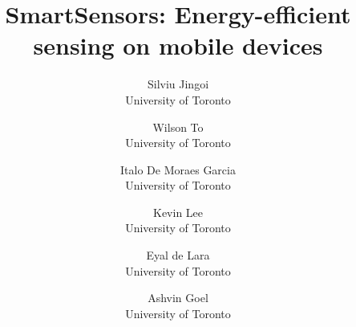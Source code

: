 \documentclass[letterpaper,twocolumn,10pt]{article}
\begin{document}
\date{}


\title{\Large \bf SmartSensors: Energy-efficient sensing on mobile devices}


\author{
{\rm Silviu Jingoi}\\
University of Toronto
\and
{\rm Wilson To}\\
University of Toronto
\and
{\rm Italo De Moraes Garcia}\\
University of Toronto
\and
{\rm Kevin Lee}\\
University of Toronto
\and
{\rm Eyal de Lara}\\
University of Toronto
\and
{\rm Ashvin Goel}\\
University of Toronto
} %

\maketitle















{\footnotesize 
}
\end{document}
